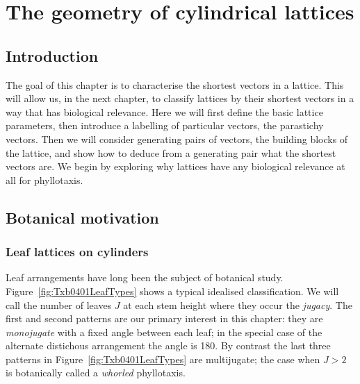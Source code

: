 

\chapter{The geometry of cylindrical lattices}
\label{ch:cylinder}
\section{Introduction}
The goal of this chapter is to characterise the shortest vectors in a lattice. This will allow us, in the next chapter, to classify lattices by their shortest vectors in a way that has biological relevance. Here we will first define the basic lattice parameters, then introduce a labelling of particular vectors, the parastichy vectors. Then we will consider generating pairs of vectors,  the building blocks of the lattice, and show how to deduce from a generating pair  what the shortest vectors are. We begin by exploring why lattices have any biological relevance at all for phyllotaxis.

\clearpage
\section{Botanical motivation}
\subsection{Leaf lattices on cylinders}

Leaf arrangements have long been the subject of botanical study. Figure~\ref{fig:Txb0401LeafTypes} shows a typical idealised classification. We will call the number of leaves $J$ at each stem height where they occur the \textit{jugacy}. The first and second patterns are our primary interest in this chapter: they are \textit{monojugate} with a fixed angle between each leaf; in the special case of the alternate distichous arrangement the angle is 180\degree.
By contrast the last three patterns in Figure~\ref{fig:Txb0401LeafTypes} are multijugate; the case when $J>2$ is botanically called a \textit{whorled} phyllotaxis.
  

